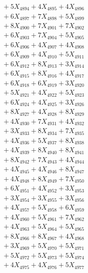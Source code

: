 \documentclass[a4paper,10pt]{article}
\begin{document}
{\begin{align}
&\;  + 5 X_{4894} + 4 X_{4895} + 4 X_{4896} \\[0.3ex]
&\;  + 6 X_{4897} + 7 X_{4898} + 5 X_{4899} \\[0.5ex]\allowbreak
&\;  + 8 X_{4900} + 7 X_{4901} + 7 X_{4902} \\[0.3ex]
&\;  + 6 X_{4903} + 7 X_{4904} + 5 X_{4905} \\[0.3ex]
&\;  + 6 X_{4906} + 4 X_{4907} + 4 X_{4908} \\[0.3ex]
&\;  + 6 X_{4909} + 4 X_{4910} + 5 X_{4911} \\[0.3ex]
&\;  + 6 X_{4912} + 8 X_{4913} + 3 X_{4914} \\[0.3ex]
&\;  + 6 X_{4915} + 8 X_{4916} + 4 X_{4917} \\[0.3ex]
&\;  + 6 X_{4918} + 6 X_{4919} + 3 X_{4920} \\[0.3ex]
&\;  + 5 X_{4921} + 4 X_{4922} + 5 X_{4923} \\[0.3ex]
&\;  + 6 X_{4924} + 4 X_{4925} + 3 X_{4926} \\[0.3ex]
&\;  + 8 X_{4927} + 4 X_{4928} + 8 X_{4929} \\[0.5ex]\allowbreak
&\;  + 4 X_{4930} + 7 X_{4931} + 4 X_{4932} \\[0.3ex]
&\;  + 3 X_{4933} + 8 X_{4934} + 7 X_{4935} \\[0.3ex]
&\;  + 4 X_{4936} + 5 X_{4937} + 8 X_{4938} \\[0.3ex]
&\;  + 4 X_{4939} + 8 X_{4940} + 8 X_{4941} \\[0.3ex]
&\;  + 8 X_{4942} + 7 X_{4943} + 4 X_{4944} \\[0.3ex]
&\;  + 4 X_{4945} + 4 X_{4946} + 8 X_{4947} \\[0.3ex]
&\;  + 4 X_{4948} + 8 X_{4949} + 7 X_{4950} \\[0.3ex]
&\;  + 6 X_{4951} + 4 X_{4952} + 3 X_{4953} \\[0.3ex]
&\;  + 3 X_{4954} + 3 X_{4955} + 3 X_{4956} \\[0.3ex]
&\;  + 4 X_{4957} + 5 X_{4958} + 6 X_{4959} \\[0.5ex]\allowbreak
&\;  + 4 X_{4960} + 5 X_{4961} + 7 X_{4962} \\[0.3ex]
&\;  + 4 X_{4963} + 5 X_{4964} + 5 X_{4965} \\[0.3ex]
&\;  + 8 X_{4966} + 8 X_{4967} + 4 X_{4968} \\[0.3ex]
&\;  + 3 X_{4969} + 5 X_{4970} + 5 X_{4971} \\[0.3ex]
&\;  + 5 X_{4972} + 5 X_{4973} + 5 X_{4974} \\[0.3ex]
&\;  + 4 X_{4975} + 4 X_{4976} + 5 X_{4977} \\[0.3ex]

\end{align}}
\end{document}
